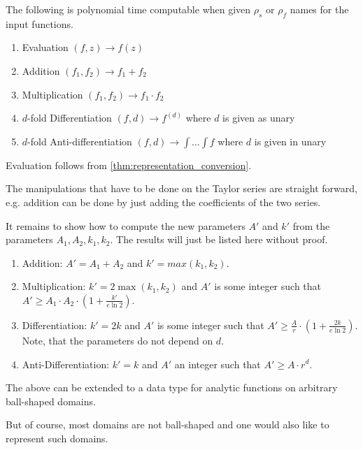 	 \begin{theorem}\label{thm:polytime_on_ball}
	 	The following is polynomial time computable when given $\rho_s$ or $\rho_f$ names for the input functions.
	 	\begin{enumerate}
	 		\item Evaluation $(f,z) \to f(z)$
	 		\item Addition $(f_1, f_2) \to f_1 + f_2$
	 		\item Multiplication $(f_1, f_2) \to f_1 \cdot f_2$
	 		\item $d$-fold Differentiation $(f,d) \to f^{(d)}$ where $d$ is given as unary
	 		\item $d$-fold Anti-differentiation $(f,d) \to \int \dots \int f$ where $d$ is given in unary
	 	\end{enumerate}
    \begin{proofsketch}
	 		Evaluation follows from \ref{thm:representation_conversion}. 

	 		The manipulations that have to be done on the Taylor series are straight forward, 
      e.g. addition can be done by just adding the coefficients of the two series.
      
	 		It remains to show how to compute the new parameters $A'$ and $k'$ from the parameters $A_1, A_2, k_1, k_2$. 
      The results will just be listed here without proof.
      \begin{enumerate}
        \item Addition: $A' = A_1 + A_2$ and $k' = max(k_1, k_2)$.
        \item Multiplication: $k' = 2\max(k_1, k_2)$ and $A'$ is some integer such that $A' \geq A_1 \cdot A_2 \cdot (1 + \frac{k'}{e \ln 2})$.
        \item Differentiation: $k' = 2k$ and $A'$ is some integer such that $A' \geq \frac{A}{r} \cdot (1+\frac{2k}{e\ln 2})$.
          Note, that the parameters do not depend on $d$.
        \item Anti-Differentiation: $k' = k$ and $A'$ an integer such that $A' \geq A \cdot r^d$.
      \end{enumerate}
	 	\end{proofsketch}
	 \end{theorem}

	The above can be extended to a data type for analytic functions on arbitrary ball-shaped domains.

	But of course, most domains are not ball-shaped and one would also like to represent such domains.
	

